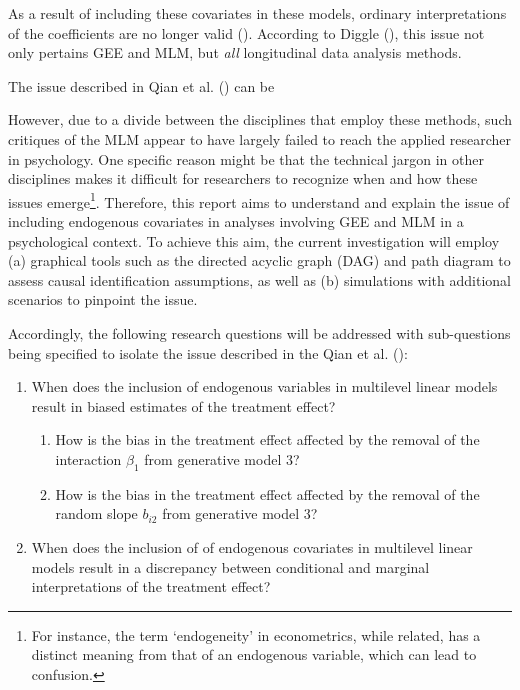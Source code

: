 \documentclass[
  12pt,
  a4paper,
]{article}
\begin{document}
As a result of including these covariates in these models, ordinary
interpretations of the coefficients are no longer valid
(). According to Diggle
(), this issue not only pertains GEE and
MLM, but \emph{all} longitudinal data analysis methods.

The issue described in Qian et al. () can
be

However, due to a divide between the disciplines that employ these
methods, such critiques of the MLM appear to have largely failed to
reach the applied researcher in psychology. One specific reason might be
that the technical jargon in other disciplines makes it difficult for
researchers to recognize when and how these issues emerge\footnote{For
  instance, the term `endogeneity' in econometrics, while related, has a
  distinct meaning from that of an endogenous variable, which can lead
  to confusion.}. Therefore, this report aims to understand and explain
the issue of including endogenous covariates in analyses involving GEE
and MLM in a psychological context. To achieve this aim, the current
investigation will employ (a) graphical tools such as the directed
acyclic graph (DAG) and path diagram to assess causal identification
assumptions, as well as (b) simulations with additional scenarios to
pinpoint the issue.

Accordingly, the following research questions will be addressed with
sub-questions being specified to isolate the issue described in the Qian
et al. ():

\begin{enumerate}
\def\labelenumi{(\arabic{enumi})}
\item
  When does the inclusion of endogenous variables in multilevel linear
  models result in biased estimates of the treatment effect?

  \begin{enumerate}
  \def\labelenumii{(\alph{enumii})}
  \item
    How is the bias in the treatment effect affected by the removal of
    the interaction \(\beta_1\) from generative model 3?
  \item
    How is the bias in the treatment effect affected by the removal of
    the random slope \(b_{i2}\) from generative model 3?
  \end{enumerate}
\item
  When does the inclusion of of endogenous covariates in multilevel
  linear models result in a discrepancy between conditional and marginal
  interpretations of the treatment effect?
\end{enumerate}
\end{document}
